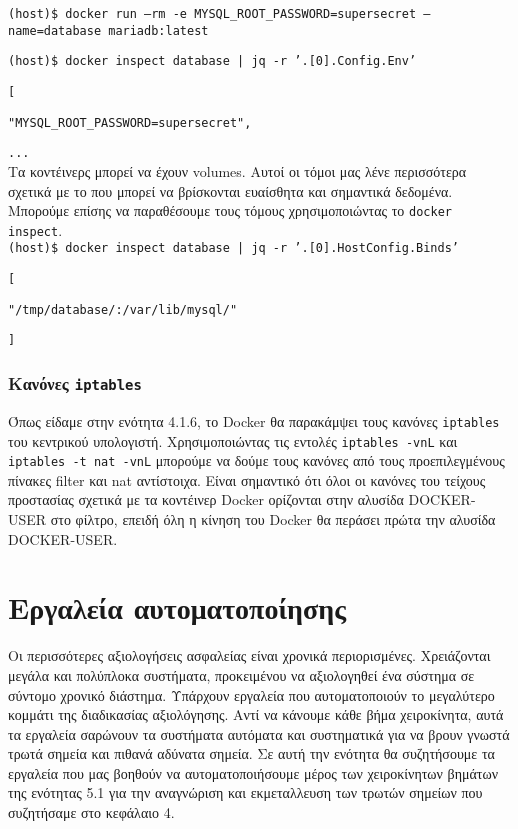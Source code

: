 \texttt{\textlatin{(host)\$ docker run --rm -e MYSQL\_ROOT\_PASSWORD=supersecret --name=database mariadb:latest}}

\texttt{\textlatin{(host)\$ docker inspect database | jq -r '.[0].Config.Env'}}

\texttt{\textlatin{[}}

\texttt{\textlatin{"MYSQL\_ROOT\_PASSWORD=supersecret",}}

\texttt{\textlatin{...}} \\

Τα κοντέινερς μπορεί να έχουν \textlatin{volumes}. Αυτοί οι τόμοι μας λένε
περισσότερα σχετικά με το που μπορεί να βρίσκονται ευαίσθητα και σημαντικά
δεδομένα. Μπορούμε επίσης να παραθέσουμε τους τόμους χρησιμοποιώντας το
\texttt{\textlatin{docker inspect}}. \\

\texttt{\textlatin{(host)\$ docker inspect database | jq -r '.[0].HostConfig.Binds'}}

\texttt{\textlatin{[}}

\texttt{\textlatin{"/tmp/database/:/var/lib/mysql/"}}

\texttt{\textlatin{]}} \\


\subsubsection{Κανόνες \texttt{\textlatin{iptables}}}

Όπως είδαμε στην ενότητα 4.1.6, το \textlatin{Docker} θα παρακάμψει τους κανόνες
\texttt{\textlatin{iptables}} του κεντρικού υπολογιστή.
Χρησιμοποιώντας τις εντολές \texttt{\textlatin{iptables -vnL}} και
\texttt{\textlatin{iptables -t nat -vnL}}  μπορούμε να δούμε τους κανόνες από
τους προεπιλεγμένους πίνακες \textlatin{filter} και  \textlatin{nat} αντίστοιχα.
Είναι σημαντικό ότι όλοι οι κανόνες του τείχους προστασίας σχετικά με τα
κοντέινερ \textlatin{Docker} ορίζονται στην αλυσίδα \textlatin{DOCKER-USER}
στο φίλτρο, επειδή όλη η κίνηση του \textlatin{Docker} θα περάσει πρώτα την
αλυσίδα \textlatin{DOCKER-USER}.

\section{Εργαλεία αυτοματοποίησης}

Οι περισσότερες αξιολογήσεις ασφαλείας είναι χρονικά περιορισμένες. Χρειάζονται
μεγάλα και πολύπλοκα συστήματα, προκειμένου να αξιολογηθεί ένα σύστημα σε
σύντομο χρονικό διάστημα. Υπάρχουν εργαλεία που αυτοματοποιούν το μεγαλύτερο
κομμάτι της διαδικασίας αξιολόγησης. Αντί να κάνουμε κάθε βήμα χειροκίνητα, αυτά
τα εργαλεία σαρώνουν τα συστήματα αυτόματα και συστηματικά για να βρουν γνωστά
τρωτά σημεία και πιθανά αδύνατα σημεία. Σε αυτή την ενότητα θα συζητήσουμε τα
εργαλεία που μας βοηθούν να αυτοματοποιήσουμε μέρος των χειροκίνητων βημάτων της
ενότητας 5.1 για την αναγνώριση και εκμεταλλευση των τρωτών σημείων που
συζητήσαμε στο κεφάλαιο 4.

